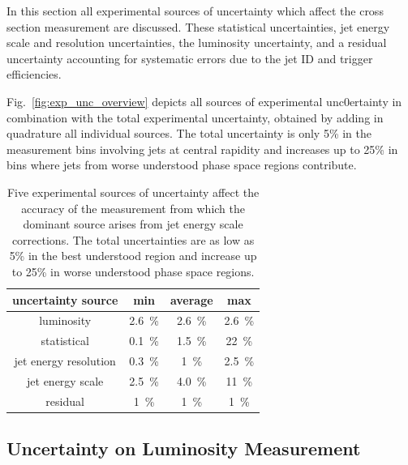 In this section all experimental sources of uncertainty which affect the cross
section measurement are discussed. These statistical uncertainties, jet energy
scale and resolution uncertainties, the luminosity uncertainty, and
a residual uncertainty accounting for systematic errors due to the jet ID and
trigger efficiencies. 

Fig.~\ref{fig:exp_unc_overview} depicts all sources of experimental unc0ertainty
in combination with the total experimental uncertainty, obtained by adding in
quadrature all individual sources. The total uncertainty is only 5\% in the
measurement bins involving jets at central rapidity and increases up to 25\% in
bins where jets from worse understood phase space regions contribute.

\begin{table}[htbp]
    \centering
    \caption[Summary of experimental uncertainties]
       {Five experimental sources of uncertainty affect the accuracy of the
        measurement from which the dominant source arises from jet energy scale
        corrections. The total uncertainties are as low as 5\% in the best understood
        region and increase up to 25\% in worse understood phase space regions.}
    \label{tab:data:expunc}
    \begin{tabular}{cccc}
    \toprule
    \textbf{uncertainty source} & \textbf{min}       & \textbf{average}   & \textbf{max}\\\midrule
    luminosity                  & \SI{2.6}{\percent} & \SI{2.6}{\percent} & \SI{2.6}{\percent}\\
    statistical                 & \SI{0.1}{\percent} & \SI{1.5}{\percent} & \SI{22}{\percent}\\
    jet energy resolution       & \SI{0.3}{\percent} & \SI{1}{\percent} & \SI{2.5}{\percent}\\
    jet energy scale            & \SI{2.5}{\percent} & \SI{4.0}{\percent} & \SI{11}{\percent}\\
    residual                    & \SI{1}{\percent} & \SI{1}{\percent} & \SI{1}{\percent}\\
    \bottomrule
    \end{tabular}
\end{table}

\subsection {Uncertainty on Luminosity Measurement}
\label{sec:luminosity_uncertainty}

